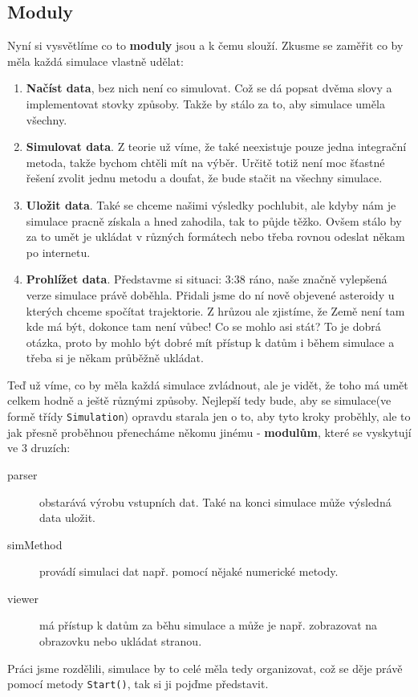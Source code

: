 \subsection{Moduly}
\label{sub:moduly}
Nyní si vysvětlíme co to \textbf{moduly} jsou a k čemu slouží.
Zkusme se zaměřit co by měla každá simulace vlastně udělat:
\begin{enumerate}
	\item \textbf{Načíst data}, bez nich není co simulovat. Což se dá popsat dvěma slovy a implementovat stovky způsoby. Takže by stálo za to, aby simulace uměla všechny.
	\item \textbf{Simulovat data}. Z teorie už víme, že také neexistuje pouze jedna integrační metoda, takže bychom chtěli mít na výběr. Určitě totiž není moc šťastné řešení zvolit jednu metodu a doufat, že bude stačit na všechny simulace.
	\item \textbf{Uložit data}. Také se chceme našimi výsledky pochlubit, ale kdyby nám je simulace pracně získala a hned zahodila, tak to půjde těžko. Ovšem stálo by za to umět je ukládat v různých formátech nebo třeba rovnou odeslat někam po internetu.
	\item \textbf{Prohlížet data}. Představme si situaci: 3:38 ráno, naše značně vylepšená verze simulace právě doběhla. Přidali jsme do ní nově objevené asteroidy u kterých chceme spočítat trajektorie. Z hrůzou ale zjistíme, že Země není tam kde má být, dokonce tam není vůbec! Co se mohlo asi stát? To je dobrá otázka, proto by mohlo být dobré mít přístup k datům i během simulace a třeba si je někam průběžně ukládat.
\end{enumerate}
Teď už víme, co by měla každá simulace zvládnout, ale je vidět, že toho má umět celkem hodně a ještě různými způsoby. Nejlepší tedy bude, aby se simulace(ve formě třídy \texttt{Simulation}) opravdu starala jen o to, aby tyto kroky proběhly, ale to jak přesně proběhnou přenecháme někomu jinému -\textbf{ modulům}, které se vyskytují ve 3 druzích:
\begin{description}
	\item[parser] obstarává výrobu vstupních dat. Také na konci simulace může výsledná data uložit.
	\item[simMethod] provádí simulaci dat např. pomocí nějaké numerické metody.
	\item[viewer] má přístup k datům za běhu simulace a může je např. zobrazovat na obrazovku nebo ukládat stranou.
\end{description}
Práci jsme rozdělili, simulace by to celé měla tedy organizovat, což se děje právě pomocí metody \texttt{Start()}, tak si ji pojďme představit.
